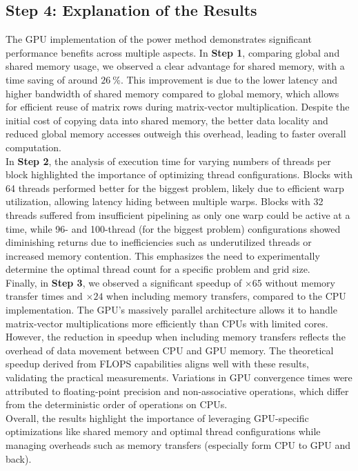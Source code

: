 \subsection{Step 4: Explanation of the Results}

The GPU implementation of the power method demonstrates significant performance benefits across multiple aspects. In \textbf{Step 1}, comparing global and shared memory usage, we observed a clear advantage for shared memory, with a time saving of around \( \SI{26}{\percent} \). This improvement is due to the lower latency and higher bandwidth of shared memory compared to global memory, which allows for efficient reuse of matrix rows during matrix-vector multiplication. Despite the initial cost of copying data into shared memory, the better data locality and reduced global memory accesses outweigh this overhead, leading to faster overall computation.\\

In \textbf{Step 2}, the analysis of execution time for varying numbers of threads per block highlighted the importance of optimizing thread configurations. Blocks with 64 threads performed better for the biggest problem, likely due to efficient warp utilization, allowing latency hiding between multiple warps. Blocks with 32 threads suffered from insufficient pipelining as only one warp could be active at a time, while 96- and 100-thread (for the biggest problem) configurations showed diminishing returns due to inefficiencies such as underutilized threads or increased memory contention. This emphasizes the need to experimentally determine the optimal thread count for a specific problem and grid size.\\

Finally, in \textbf{Step 3}, we observed a significant speedup of \( \times 65 \) without memory transfer times and \( \times 24 \) when including memory transfers, compared to the CPU implementation. The GPU's massively parallel architecture allows it to handle matrix-vector multiplications more efficiently than CPUs with limited cores. However, the reduction in speedup when including memory transfers reflects the overhead of data movement between CPU and GPU memory. The theoretical speedup derived from FLOPS capabilities aligns well with these results, validating the practical measurements. Variations in GPU convergence times were attributed to floating-point precision and non-associative operations, which differ from the deterministic order of operations on CPUs.\\

Overall, the results highlight the importance of leveraging GPU-specific optimizations like shared memory and optimal thread configurations while managing overheads such as memory transfers (especially form CPU to GPU and back).
